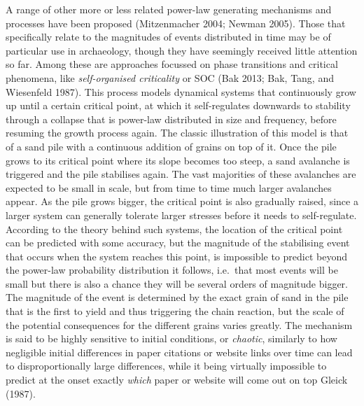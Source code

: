 \documentclass[
  12pt,
]{book}
\begin{document}
A range of other more or less related power-law generating mechanisms and processes have been proposed (Mitzenmacher 2004; Newman 2005). Those that specifically relate to the magnitudes of events distributed in time may be of particular use in archaeology, though they have seemingly received little attention so far. Among these are approaches focussed on phase transitions and critical phenomena, like \emph{self-organised criticality} or SOC (Bak 2013; Bak, Tang, and Wiesenfeld 1987). This process models dynamical systems that continuously grow up until a certain critical point, at which it self-regulates downwards to stability through a collapse that is power-law distributed in size and frequency, before resuming the growth process again. The classic illustration of this model is that of a sand pile with a continuous addition of grains on top of it. Once the pile grows to its critical point where its slope becomes too steep, a sand avalanche is triggered and the pile stabilises again. The vast majorities of these avalanches are expected to be small in scale, but from time to time much larger avalanches appear. As the pile grows bigger, the critical point is also gradually raised, since a larger system can generally tolerate larger stresses before it needs to self-regulate. According to the theory behind such systems, the location of the critical point can be predicted with some accuracy, but the magnitude of the stabilising event that occurs when the system reaches this point, is impossible to predict beyond the power-law probability distribution it follows, i.e.~that most events will be small but there is also a chance they will be several orders of magnitude bigger. The magnitude of the event is determined by the exact grain of sand in the pile that is the first to yield and thus triggering the chain reaction, but the scale of the potential consequences for the different grains varies greatly. The mechanism is said to be highly sensitive to initial conditions, or \emph{chaotic}, similarly to how negligible initial differences in paper citations or website links over time can lead to disproportionally large differences, while it being virtually impossible to predict at the onset exactly \emph{which} paper or website will come out on top Gleick (1987).
\end{document}
